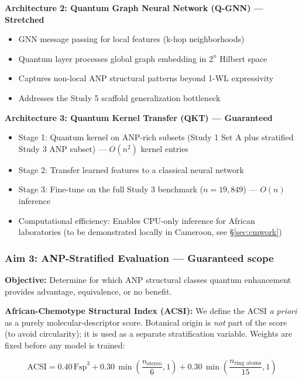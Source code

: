 \documentclass[11pt,a4paper]{article}
\begin{document}
\textbf{Architecture 2: Quantum Graph Neural Network (Q-GNN) --- Stretched}
\begin{itemize}
    \item GNN message passing for local features (k-hop neighborhoods) \cite{morris2019}
    \item Quantum layer processes global graph embedding in $2^n$ Hilbert space
    \item Captures non-local ANP structural patterns beyond 1-WL expressivity
    \item Addresses the Study 5 scaffold generalization bottleneck
\end{itemize}

\textbf{Architecture 3: Quantum Kernel Transfer (QKT) --- Guaranteed}
\begin{itemize}
    \item Stage 1: Quantum kernel on ANP-rich subsets (Study 1 Set A plus stratified Study 3 ANP subset) --- $O(n^2)$ kernel entries
    \item Stage 2: Transfer learned features to a classical neural network
    \item Stage 3: Fine-tune on the full Study 3 benchmark ($n = 19{,}849$) --- $O(n)$ inference
    \item Computational efficiency: Enables CPU-only inference for African laboratories (to be demonstrated locally in Cameroon, see \S\ref{sec:cmwork})
\end{itemize}

\subsubsection{Aim 3: ANP-Stratified Evaluation --- Guaranteed scope}

\textbf{Objective:} Determine for which ANP structural classes quantum enhancement provides advantage, equivalence, or no benefit.

\textbf{African-Chemotype Structural Index (ACSI):} We define the ACSI \textit{a priori} as a purely molecular-descriptor score. Botanical origin is \textit{not} part of the score (to avoid circularity); it is used as a separate stratification variable. Weights are fixed before any model is trained:

\begin{equation}
\text{ACSI} = 0.40\,\text{Fsp}^3 + 0.30\,\min\!\left(\frac{n_{\text{stereo}}}{6}, 1\right) + 0.30\,\min\!\left(\frac{n_{\text{ring atoms}}}{15}, 1\right)
\label{eq:acsi}
\end{equation}
\end{document}
